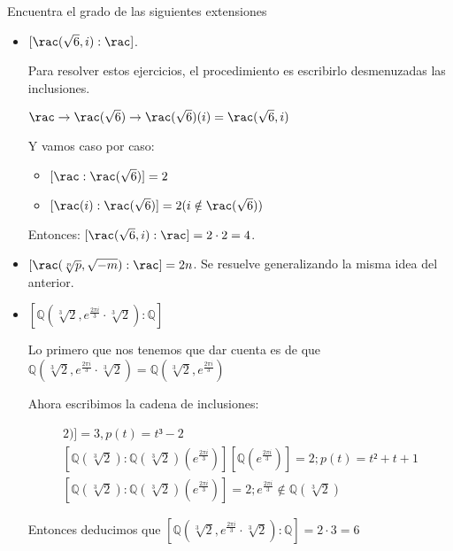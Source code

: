 \begin{problem}Encuentra el grado de las siguientes extensiones

\solution

\begin{itemize}

\item $[\rac(\sqrt{6},i):\rac]$. 

 Para resolver estos ejercicios, el procedimiento es escribirlo desmenuzadas las inclusiones.

$\rac \to \rac(\sqrt{6}) \to \rac(\sqrt{6})(i) = \rac(\sqrt{6},i)$

Y vamos caso por caso:

\begin{itemize}
\item $[\rac: \rac(\sqrt{6})] = 2$
\item $[\rac(i): \rac(\sqrt{6}) ] = 2 (i \notin \rac(\sqrt{6}))$
\end{itemize}

Entonces: $[\rac(\sqrt{6},i):\rac]= 2\cdot 2 = 4$.

\item $[\rac(\sqrt[n]{p},\sqrt{-m}):\rac] = 2n$. Se resuelve generalizando la misma idea del anterior.

\item $[ℚ(\sqrt[3]{2},e^{\frac{2 \pi i}{3}}\cdot \sqrt[3]{2}):ℚ]$

Lo primero que nos tenemos que dar cuenta es de que \\
 $ℚ(\sqrt[3]{2},e^{\frac{2 \pi i}{3}}\cdot \sqrt[3]{2}) = ℚ(\sqrt[3]{2},e^{\frac{2 \pi i}{3}})$
 
Ahora escribimos la cadena de inclusiones:

\begin{gather*}
[ℚ : ℚ(\sqrt[3]{2})] = 3, p(t)=t³-2\\
[ℚ(\sqrt[3]{2}) : ℚ(\sqrt[3]{2})(e^{\frac{2\pi i}{3}})]  [ℚ(e^{\frac{2\pi i}{3}})] = 2; p(t) =  t²+t+1\\
[ℚ(\sqrt[3]{2}) : ℚ(\sqrt[3]{2})(e^{\frac{2\pi i}{3}})] = 2; e^{\frac{2\pi i}{3}}∉ℚ(\sqrt[3]{2})
\end{gather*}

Entonces deducimos que $[ℚ(\sqrt[3]{2},e^{\frac{2 \pi i}{3}}\cdot \sqrt[3]{2}):ℚ] = 2·3 = 6$
\end{itemize}

\end{problem}


